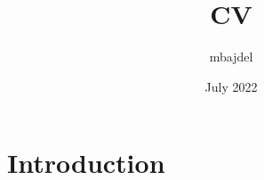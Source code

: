 \documentclass{article}
\title{CV}
\author{mbajdel }
\date{July 2022}
\begin{document}
\maketitle

\section{Introduction}
\end{document}
